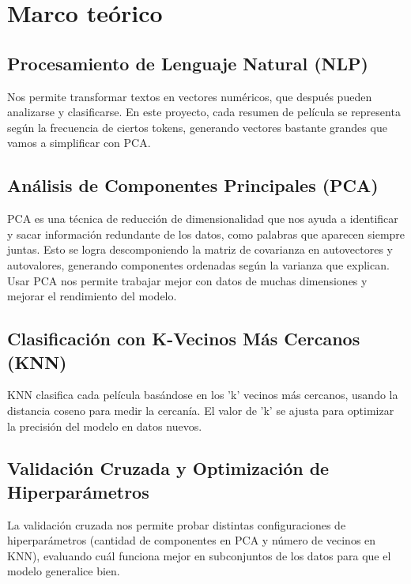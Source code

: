 \section{Marco teórico}
\label{sec:intro_teorica}

\subsection{Procesamiento de Lenguaje Natural (NLP)}
Nos permite transformar textos en vectores numéricos, que después pueden analizarse y clasificarse. En este proyecto, cada resumen de película se representa según la frecuencia de ciertos tokens, generando vectores bastante grandes que vamos a simplificar con PCA.

\subsection{Análisis de Componentes Principales (PCA)}
PCA es una técnica de reducción de dimensionalidad que nos ayuda a identificar y sacar información redundante de los datos, como palabras que aparecen siempre juntas. Esto se logra descomponiendo la matriz de covarianza en autovectores y autovalores, generando componentes ordenadas según la varianza que explican. Usar PCA nos permite trabajar mejor con datos de muchas dimensiones y mejorar el rendimiento del modelo.

\subsection{Clasificación con K-Vecinos Más Cercanos (KNN)}
KNN clasifica cada película basándose en los 'k' vecinos más cercanos, usando la distancia coseno para medir la cercanía. El valor de 'k' se ajusta para optimizar la precisión del modelo en datos nuevos.

\subsection{Validación Cruzada y Optimización de Hiperparámetros}
La validación cruzada nos permite probar distintas configuraciones de hiperparámetros (cantidad de componentes en PCA y número de vecinos en KNN), evaluando cuál funciona mejor en subconjuntos de los datos para que el modelo generalice bien.